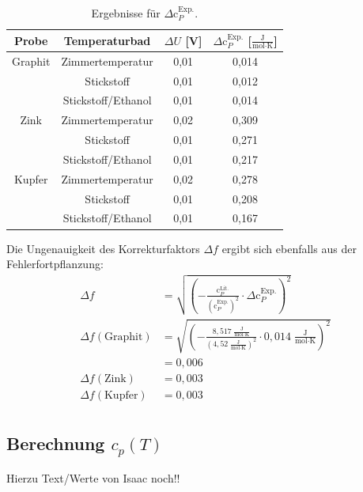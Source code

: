 \documentclass[12pt,a4paper,titlepage,headinclude,bibtotoc]{scrartcl}
\begin{document}
\begin{table}[h!]
\centering
\caption{Ergebnisse für $\Delta \text{c}_P^{\text{Exp.}}$.}
\begin{tabular}{c|c|c|c}
Probe&Temperaturbad&$\Delta U$ [V]&$\Delta \text{c}_P^{\text{Exp.}}$ [$\frac{\text{J}}{\text{mol}\cdot\text{K}}$]\\
\hline
Graphit& Zimmertemperatur&0,01&0,014\\
\hline
&Stickstoff&0,01&0,012\\
\hline
&Stickstoff/Ethanol&0,01&0,014\\
\hline
Zink &Zimmertemperatur&0,02& 0,309 \\
\hline
&Stickstoff&0,01&0,271\\
\hline
&Stickstoff/Ethanol&0,01&0,217\\
\hline
Kupfer &Zimmertemperatur&0,02& 0,278\\
\hline
&Stickstoff&0,01&0,208\\
\hline
&Stickstoff/Ethanol&0,01&0,167\\
\end{tabular}
\end{table}
\FloatBarrier
Die Ungenauigkeit des Korrekturfaktors $\Delta f$ ergibt sich ebenfalls aus der Fehlerfortpflanzung:
\begin{align}
\Delta f &= \sqrt{ \left(-\frac{\text{c}_P^{\text{Lit.}}}{(\text{c}_P^{\text{Exp.}})^2}\cdot \Delta \text{c}_P^{\text{Exp.}} \right)^2}\\
\Delta f (\text{Graphit})&= \sqrt{ \left(-\frac{8,517\;\frac{\text{J}}{\text{mol}\cdot\text{K}}}{(4,52\;\frac{\text{J}}{\text{mol}\cdot\text{K}})^2}\cdot 0,014\;\frac{\text{J}}{\text{mol}\cdot\text{K}}\right)^2}\\
&= 0,006\\
\Delta f (\text{Zink})&=0,003\\ 
\Delta f (\text{Kupfer})&=0,003\\
\end{align} 

\subsection{Berechnung $c_{p}(T)$}

Hierzu Text/Werte von Isaac noch!!\\
\end{document}
